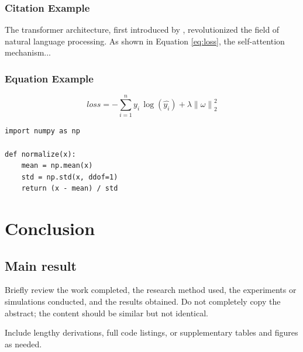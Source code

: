 \documentclass[UTF8,AutoFakeBold=1,AutoFakeSlant,zihao=-4]{SCNU}
\begin{document}
\subsubsection{Citation Example}

The transformer architecture, first introduced by \cite{vaswani2017attention}, revolutionized the field of natural language processing. As shown in Equation \ref{eq:loss}, the self-attention mechanism...

\subsubsection{Equation Example}

\begin{equation}
    loss = -\sum_{i=1}^{n}{y_i\,\log(\hat{y_i})} + \lambda \left\lVert\omega\right\rVert_2^2
    \label{eq:loss}
\end{equation}

\begin{verbatim}
import numpy as np

def normalize(x):
    mean = np.mean(x)
    std = np.std(x, ddof=1)
    return (x - mean) / std
\end{verbatim}





\section{Conclusion}
\subsection{Main result}
\noindent\hspace*{4\ccwd}Briefly review the work completed, the research method used, the experiments or simulations conducted, and the results obtained. Do not completely copy the abstract; the content should be similar but not identical.





\begin{references}
    
\end{references}

\clearpage
{}
\appendixformat
\noindent\hspace*{4\ccwd}Include lengthy derivations, full code listings, or supplementary tables and figures as needed.
\end{document}
